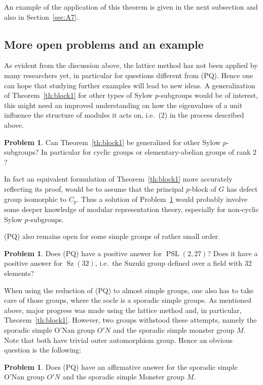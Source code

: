 \documentclass[10pt,a4paper,reqno]{amsart}
\theoremstyle{definition}
\newtheorem{problem}[theorem]{Problem}
\theoremstyle{remark}
\begin{document}
{An example of the application of this theorem is given in the next subsection and also in Section~\ref{sec:A7}.

\subsection{More open problems and an example}
As evident from the discussion above, the lattice method has not been applied by many researchers yet, in particular for questions different from (PQ). Hence one can hope that studying further examples will lead to new ideas. A generalization of Theorem~\ref{th:block1} for other types of Sylow $p$-subgroups would be of interest, this might need an improved understanding on how the eigenvalues of a unit influence the structure of modules it acts on, i.e.\ (2) in the process described above.

\begin{problem}\label{prob:more_gen_syl} Can Theorem~\ref{th:block1} be generalized for other Sylow $p$-subgroups? In particular for cyclic groups or elementary-abelian groups of rank $2$? \end{problem}

In fact an equivalent formulation of Theorem~\ref{th:block1} more accurately reflecting its proof, would be to assume that the principal $p$-block of $G$ has defect group isomorphic to $C_p$. Thus a solution of Problem~\ref{prob:more_gen_syl} would probably involve some deeper knowledge of modular representation theory, especially for non-cyclic Sylow $p$-subgroups.

(PQ) also remains open for some simple groups of rather small order.

\begin{problem} Does (PQ) have a positive answer for $\operatorname{PSL}(2,27)$? Does it have a positive answer for $\operatorname{Sz}(32)$, i.e.\ the Suzuki group defined over a field with 32 elements?  \end{problem}

When using the reduction of (PQ) to almost simple groups, one also has to take care of those groups, where the socle is a sporadic simple groups. As mentioned above, major progress was made using the lattice method and, in particular, Theorem~\ref{th:block1}. However, two groups withstood these attempts, namely the sporadic simple O'Nan group $O'N$ and the sporadic simple monster group $M$. Note that both have trivial outer automorphism group. Hence an obvious question is the following:
%
\begin{problem} Does (PQ) have an affirmative answer for 
 the sporadic simple O'Nan group $O'N$ and the sporadic simple Monster group $M$.
\end{problem}

}
\end{document}
